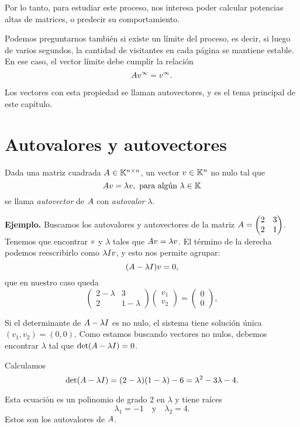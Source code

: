 Por lo tanto, para estudiar este proceso, nos interesa poder calcular potencias altas de matrices, o predecir su comportamiento.

Podemos preguntarnos también si existe un límite del proceso, es decir, si luego de varios segundos, la cantidad de visitantes en cada página se mantiene estable. En ese caso, el vector límite debe cumplir la relación
$$
\Ab \vb^{\infty} = \vb^{\infty}.
$$

Los vectores con esta propiedad se llaman autovectores, y es el tema principal de este capítulo.




\section{Autovalores y autovectores}

Dada una matriz cuadrada $\Ab \in \K^{n \times n}$, un vector $\vb \in \K^n$ no nulo tal que
$$
\Ab \vb = \lambda \vb, \text{ para algún } \lambda \in \K
$$ se llama \emph{autovector} de $\Ab$ con \emph{autovalor} $\lambda$.

\textbf{Ejemplo.} Buscamos los autovalores y autovectores de la matriz
$\Ab = \begin{pmatrix} 2 & 3 \\ 2 & 1 \end{pmatrix}$. Tenemos que
encontrar $\vb$ y $\lambda$ tales que $\Ab \vb = \lambda \vb$. El
término de la derecha podemos reescribirlo como $\lambda \Ib \vb$, y esto
nos permite agrupar:
$$(\Ab - \lambda \Ib) \vb = 0,$$
que en nuestro caso queda
$$
\begin{pmatrix}
2 - \lambda & 3 \\
2 & 1 - \lambda
\end{pmatrix}
\begin{pmatrix} v_1 \\ v_2 \end{pmatrix} =
\begin{pmatrix} 0 \\ 0 \end{pmatrix},
$$

Si el determinante de $\Ab - \lambda \Ib$ es no nulo, el sistema tiene
solución única $(v_1, v_2) = (0,0)$. Como estamos buscando vectores no
nulos, debemos encontrar $\lambda$ tal que $\det(\Ab - \lambda \Ib) = 0$.

Calculamos
$$\det(\Ab  - \lambda \Ib) = (2 - \lambda)(1 - \lambda ) - 6 = \lambda^2 - 3 \lambda - 4.$$

Esta ecuación es un polinomio de grado 2 en $\lambda$ y tiene raíces
$$\lambda_1 = -1 \quad \text{y} \quad \lambda_2 = 4.$$
Estos son los autovalores de $\Ab$.

